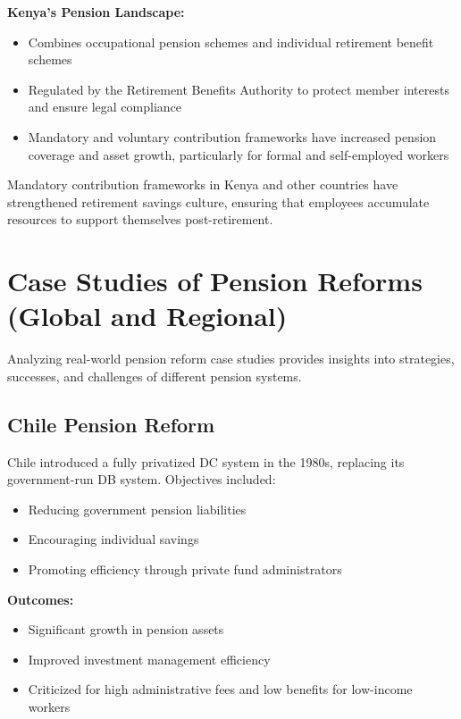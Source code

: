 \documentclass[12pt,a4paper]{article}
\begin{document}
\textbf{Kenya's Pension Landscape:}
\begin{itemize}
    \item Combines occupational pension schemes and individual retirement benefit schemes
    \item Regulated by the Retirement Benefits Authority to protect member interests and ensure legal compliance
    \item Mandatory and voluntary contribution frameworks have increased pension coverage and asset growth, particularly for formal and self-employed workers
\end{itemize}

Mandatory contribution frameworks in Kenya and other countries have strengthened retirement savings culture, ensuring that employees accumulate resources to support themselves post-retirement.

\section{Case Studies of Pension Reforms (Global and Regional)}

Analyzing real-world pension reform case studies provides insights into strategies, successes, and challenges of different pension systems.

\subsection{Chile Pension Reform}

Chile introduced a fully privatized DC system in the 1980s, replacing its government-run DB system. Objectives included:
\begin{itemize}
    \item Reducing government pension liabilities
    \item Encouraging individual savings
    \item Promoting efficiency through private fund administrators
\end{itemize}

\textbf{Outcomes:}
\begin{itemize}
    \item Significant growth in pension assets
    \item Improved investment management efficiency
    \item Criticized for high administrative fees and low benefits for low-income workers
\end{itemize}
\end{document}
